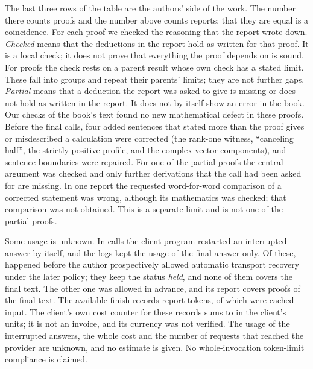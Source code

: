 The last three rows of the table are the authors' side of the work. The
number \aiRereadPartial{} there counts proofs and the number
\aiRereadPassNotes{} above counts reports; that they are equal is a
coincidence. For each
proof we checked the reasoning that the report wrote down. \emph{Checked}
means that the deductions in the report hold as written for that proof. It is
a local check; it does not prove that everything the proof depends on is
sound. For \aiRereadConditional{} proofs the check rests on a parent result
whose own check has a stated limit. These fall into
\aiRereadConditionalGroups{} groups and repeat their parents' limits; they
are not further gaps. \emph{Partial} means that a deduction the report was
asked to give is missing or does not hold as written in the report. It does
not by itself show an error in the book. Our checks of the book's text found
no new mathematical defect in these proofs. Before the final calls, four added sentences that stated more than the proof
gives or misdescribed a calculation were corrected (the rank-one witness,
``canceling half'', the strictly positive profile, and the complex-vector
components), and sentence boundaries were repaired. For one of the partial proofs the central argument was
checked and only further derivations that the call had been asked for are
missing. In one report the requested word-for-word comparison of a corrected
statement was wrong, although its mathematics was checked; that comparison
was not obtained. This is a separate limit and is not one of the partial
proofs.

Some usage is unknown. In \aiRereadRestarted{} calls the client program
restarted an interrupted answer by itself, and the logs kept the usage of the
final answer only. Of these, \aiRereadRestartedHeld{} happened before the
author prospectively allowed automatic transport recovery under the later
policy; they keep the status \emph{held}, and
none of them covers the final text. The other one was allowed in advance, and
its report covers \aiRereadRestartedCurrentProofs{} proofs of the final text.
The available finish records report \aiRereadTokens{} tokens, of which
\aiRereadTokensCached{} were cached input. The client's own cost counter for
these records sums to \aiRereadCostCounter{} in the client's units; it is not an
invoice, and its currency was not verified. The usage of the
interrupted answers, the whole cost and the number of requests that reached
the provider are unknown, and no estimate is given. No whole-invocation token-limit
compliance is claimed.

